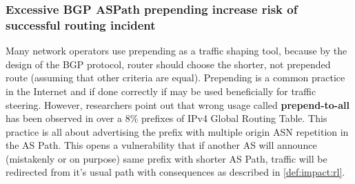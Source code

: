 \subsubsection{Excessive BGP ASPath prepending increase risk of successful routing incident}
Many network operators use prepending as a traffic shaping tool, because by the design of the BGP protocol, router should choose the shorter, not prepended route (assuming that other criteria are equal). Prepending is a common practice in the Internet and if done correctly if may be used beneficially for traffic steering. However, researchers point out\cite{Madory2019} that wrong usage called \textbf{prepend-to-all} has been observed in over a 8\% prefixes of IPv4 Global Routing Table. This practice is all about advertising the prefix with multiple origin ASN repetition in the AS Path. This opens a vulnerability that if another AS will announce (mistakenly or on purpose) same prefix with shorter AS Path, traffic will be redirected from it's usual path with consequences as described in \ref{def:impact:rl}. 
